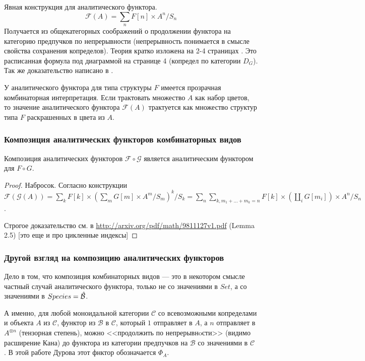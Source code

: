 Явная конструкция для аналитического функтора.
\begin{equation}
\label{eq:an}
	\mathcal F(A) = \sum\limits_n F[n] \times A^n / S_n
\end{equation}
Получается из общекатегорных соображений о продолжении функтора на категорию
предпучков по непрерывности (непрерывность понимается в смысле свойства
сохранения копределов). Теория кратко изложена на 2-4 страницах \cite{DoldKan}. Это
расписанная формула под диаграммой на странице 4 (копредел по категории $D_G$).
Так же доказательство написано в \cite{BergTrees}.

\begin{remark}
\label{rem:color}
У аналитического функтора для типа структуры $F$ имеется прозрачная
комбинаторная интерпретация.
Если трактовать множество $A$ как набор цветов,
то значение аналитического функтора $\mathcal F(A)$ трактуется как множество структур типа $F$
раскрашенных в цвета из $A$.
\end{remark}

\subsubsection{Композиция аналитических функторов комбинаторных видов}
\begin{theorem}
Композиция аналитических функторов $\mathcal F \circ \mathcal G$ является
аналитическим функтором для $F \circ G$.
\end{theorem}
\begin{proof}
Набросок. Согласно конструкции $\mathcal F(\mathcal
G (A)) = \sum\limits_k F[k] \times (\sum\limits_m G[m] \times A^m / S_m)^k /
S_k = \sum\limits_n \sum\limits_{k, m_1 + \dots + m_k = n} F[k] \times
(\coprod\limits_{i} G[m_i]) \times A^n / S_n$.

Строгое доказательство см. в \url{http://arxiv.org/pdf/math/9811127v1.pdf}
(Lemma 2.5) [это еще и про цикленные индексы]
\end{proof}

\subsubsection{Другой взгляд на композицию аналитических функторов}
Дело в том, что композиция комбинаторных видов --- это в некотором смысле
частный случай аналитического функтора, только не со значениями в $Set$,
а со значениями в $Species = \Hat {\mathcal B}$.

А именно, для любой моноидальной категории $\mathcal C$ со всевозможными
копределами и объекта $A$ из $\mathcal C$, функтор из $\mathcal B$ в $\mathcal
C$, который $1$ отправляет в $A$, а $n$ отправляет в $A^{\otimes n}$ (тензорная
степень), можно <<продолжить по непрерывнoсти>> (видимо расширение Кана) до
функтора из категории предпучков на $\mathcal B$ со значениями в $\mathcal C$
\cite{Durov}. В этой работе Дурова этот фнктор обозначается $\Phi_A$.


